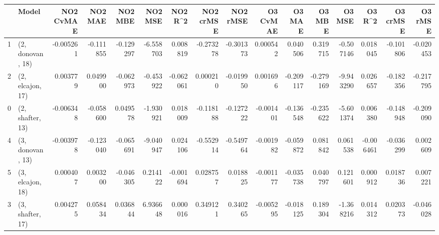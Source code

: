 \begin{tabular}{llrrrrrrrrrrrrrr}
\toprule
{} &             Model &  NO2 CvMAE &   NO2 MAE &   NO2 MBE &   NO2 MSE &   NO2 R\textasciicircum2 &  NO2 crMSE &  NO2 rMSE &  O3 CvMAE &    O3 MAE &    O3 MBE &    O3 MSE &    O3 R\textasciicircum2 &  O3 crMSE &   O3 rMSE \\
\midrule
1 &  (2, donovan, 18) &  -0.005261 & -0.111855 & -0.129297 & -6.558703 &  0.008819 &  -0.273278 & -0.301373 &  0.000542 &  0.040506 &  0.319715 & -0.507146 &  0.018045 & -0.101806 & -0.020453 \\
2 &  (2, elcajon, 17) &   0.003779 &  0.049900 & -0.062973 & -0.453922 & -0.062061 &   0.000210 & -0.019950 &  0.001696 & -0.209117 & -0.279169 & -9.943290 &  0.026657 & -0.182356 & -0.217795 \\
0 &  (2, shafter, 13) &  -0.006348 & -0.058600 &  0.049578 & -1.930921 &  0.018009 &  -0.118188 & -0.127222 & -0.001401 & -0.136548 & -0.235622 & -5.601374 &  0.006380 & -0.148948 & -0.209090 \\
4 &  (3, donovan, 13) &  -0.003978 & -0.123040 & -0.065691 & -9.040947 &  0.024106 &  -0.552914 & -0.549764 & -0.001982 & -0.059872 &  0.081842 &  0.061538 & -0.006461 & -0.036299 &  0.002609 \\
5 &  (3, elcajon, 18) &   0.000407 &  0.003200 & -0.046305 &  0.214122 & -0.001694 &   0.028757 &  0.018825 & -0.001177 & -0.035738 &  0.040797 &  0.121601 &  0.000912 &  0.018736 &  0.007221 \\
3 &  (3, shafter, 17) &   0.004275 &  0.058434 &  0.036844 &  6.936648 &  0.000016 &   0.349121 &  0.340265 & -0.005295 & -0.018125 &  0.189304 & -1.368216 &  0.014312 &  0.020373 & -0.046028 \\
\bottomrule
\end{tabular}
